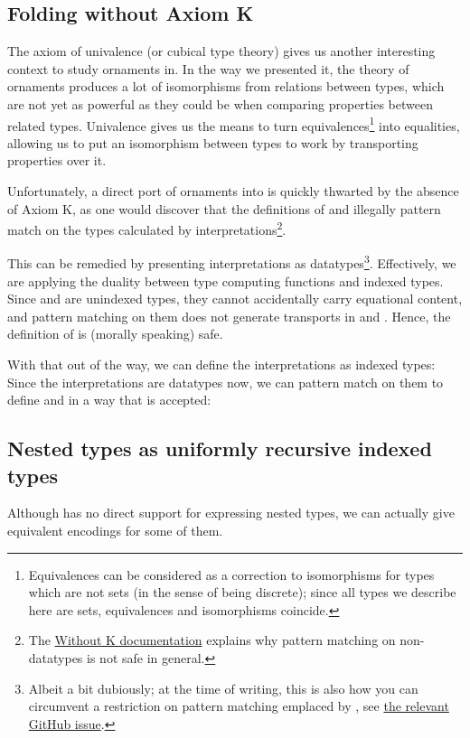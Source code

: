 \begin{appendix}
\subsection{Folding without Axiom K}\label{app:withoutk}
The axiom of univalence (or cubical type theory) gives us another interesting context to study ornaments in. In the way we presented it, the theory of ornaments produces a lot of isomorphisms from relations between types, which are not yet as powerful as they could be when comparing properties between related types. Univalence gives us the means to turn equivalences\footnote{Equivalences can be considered as a correction to isomorphisms for types which are not sets (in the sense of being discrete); since all types we describe here are sets, equivalences and isomorphisms coincide.} into equalities, allowing us to put an isomorphism between types to work by transporting properties over it.

Unfortunately, a direct port of ornaments into  is quickly thwarted by the absence of Axiom K, as one would discover that the definitions of  and  illegally pattern match on the types calculated by interpretations\footnote{The \href{https://agda.readthedocs.io/en/v2.6.4.1-rc1/language/without-k.html}{Without K documentation} explains why pattern matching on non-datatypes is not safe in general.}.

This can be remedied by presenting interpretations as datatypes\footnote{Albeit a bit dubiously; at the time of writing, this is also how you can circumvent a restriction on pattern matching emplaced by , see \href{https://github.com/agda/agda/issues/5910\#issuecomment-1601301237}{the relevant GitHub issue}.}. Effectively, we are applying the duality between type computing functions and indexed types. Since  and  are unindexed types, they cannot accidentally carry equational content, and pattern matching on them does not generate transports in  and . Hence, the definition of  is (morally speaking) safe.

With that out of the way, we can define the interpretations as indexed types:
Since the interpretations are datatypes now, we can pattern match on them to define  and  in a way that is accepted:


\subsection{Nested types as uniformly recursive indexed types}\label{app:unnested}
Although  has no direct support for expressing nested types, we can actually give equivalent encodings for some of them.


\end{appendix}
